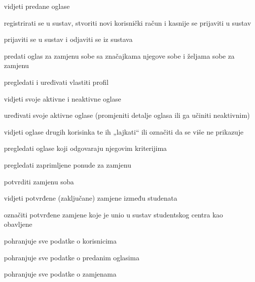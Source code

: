 \begin{packed_enum}
	\item  {}
	
	\begin{packed_enum}
		
		\item vidjeti predane oglase
		\item registrirati se u sustav, stvoriti novi korisnički račun i kasnije se prijaviti u sustav
		
	\end{packed_enum}
	
	\item  {}
	
	\begin{packed_enum}
		
		\item prijaviti se u sustav i odjaviti se iz sustava
		\item predati oglas za zamjenu sobe sa značajkama njegove sobe i željama sobe za zamjenu
		\item pregledati i uređivati vlastiti profil 
		\item vidjeti svoje aktivne i neaktivne oglase
		\item uređivati svoje aktivne oglase (promjeniti detalje oglasa ili ga učiniti neaktivnim)
		\item vidjeti oglase drugih korisinka te ih „lajkati“ ili označiti da se više ne prikazuje
		\item pregledati oglase koji odgovaraju njegovim kriterijima
		\item pregledati zaprimljene ponude za zamjenu
		\item potvrditi zamjenu soba
		
	\end{packed_enum}
		
	\item  {}
	
	\begin{packed_enum}
		
		\item vidjeti potvrđene (zaključane) zamjene između studenata
		\item označiti potvrđene zamjene koje je unio u sustav studentskog centra kao obavljene
		
	\end{packed_enum}
	
	\item  {}
	
	\begin{packed_enum}
		
		\item pohranjuje sve podatke o korisnicima
		\item pohranjuje sve podatke o predanim oglasima
		\item pohranjuje sve podatke o zamjenama
		
	\end{packed_enum}
\end{packed_enum}

